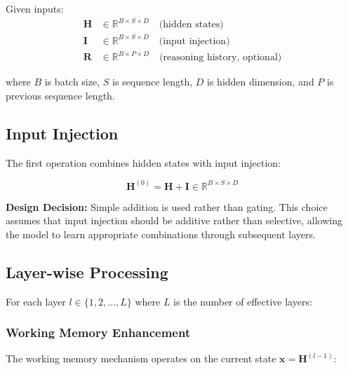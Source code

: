 \documentclass{article}
\begin{document}
Given inputs:
\begin{align}
\mathbf{H} &\in \mathbb{R}^{B \times S \times D} \quad \text{(hidden states)} \\
\mathbf{I} &\in \mathbb{R}^{B \times S \times D} \quad \text{(input injection)} \\
\mathbf{R} &\in \mathbb{R}^{B \times P \times D} \quad \text{(reasoning history, optional)}
\end{align}

where $B$ is batch size, $S$ is sequence length, $D$ is hidden dimension, and $P$ is previous sequence length.

\subsection{Input Injection}

The first operation combines hidden states with input injection:

\begin{equation}
\mathbf{H}^{(0)} = \mathbf{H} + \mathbf{I} \in \mathbb{R}^{B \times S \times D}
\end{equation}

\textbf{Design Decision:} Simple addition is used rather than gating. This choice assumes that input injection should be additive rather than selective, allowing the model to learn appropriate combinations through subsequent layers.

\subsection{Layer-wise Processing}

For each layer $l \in \{1, 2, \ldots, L\}$ where $L$ is the number of effective layers:

\subsubsection{Working Memory Enhancement}

The working memory mechanism operates on the current state $\mathbf{x} = \mathbf{H}^{(l-1)}$:
\end{document}
